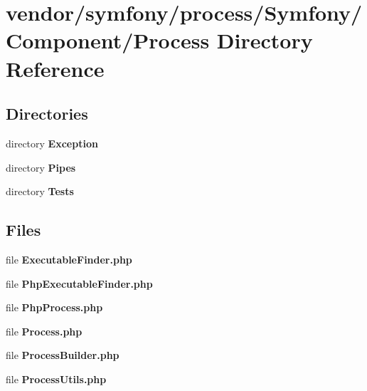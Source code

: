 \section{vendor/symfony/process/\+Symfony/\+Component/\+Process Directory Reference}
\label{dir_3a7203c1694a9a031b59ec2515160fba}
\subsection*{Directories}
\begin{DoxyCompactItemize}
\item 
directory {\bf Exception}
\item 
directory {\bf Pipes}
\item 
directory {\bf Tests}
\end{DoxyCompactItemize}
\subsection*{Files}
\begin{DoxyCompactItemize}
\item 
file {\bf Executable\+Finder.\+php}
\item 
file {\bf Php\+Executable\+Finder.\+php}
\item 
file {\bf Php\+Process.\+php}
\item 
file {\bf Process.\+php}
\item 
file {\bf Process\+Builder.\+php}
\item 
file {\bf Process\+Utils.\+php}
\end{DoxyCompactItemize}
